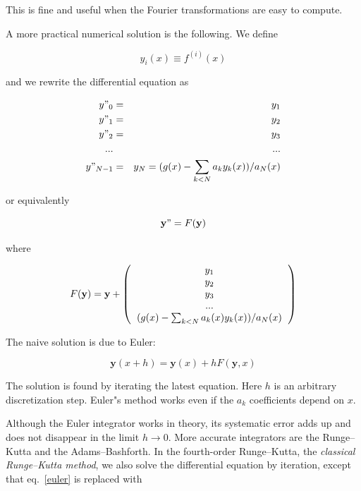 \documentclass[justified, sixbynine]{tufte-book}
\theoremstyle{plain}%
\newtheorem * {corollary}{Corollary}
\theoremstyle{definition}
\theoremstyle{remark}
\newtheorem * {remark}{Remark}
\newtheorem * {note}{Note}
\begin{document}
\begin{fullwidth}
This is fine and useful when the Fourier transformations are easy to compute.

A more practical numerical solution is the following. We define

\begin{equation}
y_i(x) \equiv f^{(i)}(x)
\end{equation}

and we rewrite the differential equation as

\begin{eqnarray}
y"_0 &=& y_1 \\
y"_1 &=& y_2 \\
y"_2 &=& y_3 \\
... && ... \\
y"_{N-1} &=& y_N = (g(x)-\sum_{k<N} a_k y_k(x))/a_N(x)
\end{eqnarray}

or equivalently

\begin{equation}
\mathbf{y}" = F(\mathbf{y})
\end{equation}

where

\begin{equation}
F(\mathbf{y}) = \mathbf{y}+\left(\begin{tabular}{c}
$y_1$ \\
$y_2$ \\
$y_3$ \\
... \\
$(g(x)-\sum_{k<N} a_k(x)y_k(x))/a_N(x)$
\end{tabular}\right)
\end{equation}

The naive solution is due to Euler:

\begin{equation}
\mathbf{y}(x+h) = \mathbf{y}(x) + hF(\mathbf{y}, x)\label{euler}
\end{equation}

The solution is found by iterating the latest equation. Here $h$ is an arbitrary discretization step. Euler"s method works even if the $a_k$ coefficients depend on $x$.

 Although the Euler integrator works in theory, its systematic error adds up and does not disappear in the limit $h\rightarrow 0$. More accurate integrators are the Runge--Kutta and the Adams--Bashforth. In the fourth-order Runge--Kutta, the {\it classical Runge--Kutta method}, we also solve the differential equation by iteration, except that eq.~\ref{euler} is replaced with


\end{fullwidth}
\end{document}

